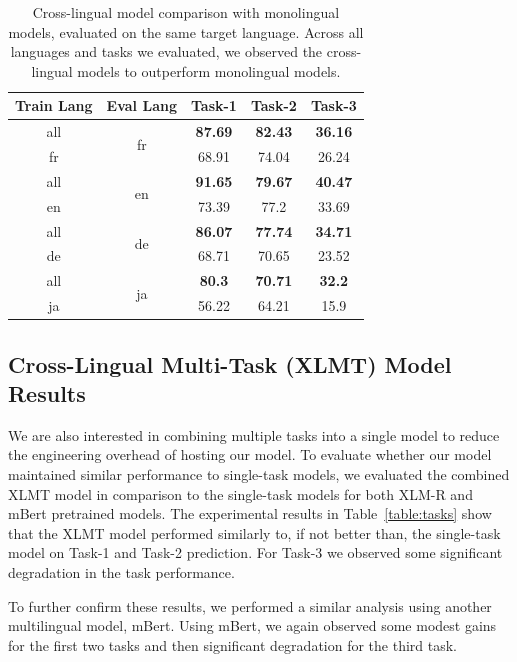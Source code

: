 \begin{table}[h]
\centering
\begin{tabular}{ccccc}
    \hline
    \textbf{Train Lang} & \textbf{Eval Lang} &  \textbf{Task-1} & \textbf{Task-2} & \textbf{Task-3} \\
    \hline
    all & \multirow{2}{*}{fr} & \textbf{87.69} & \textbf{82.43} & \textbf{36.16} \\
    fr & & 68.91 & 74.04 & 26.24 \\
    \hline
    all & \multirow{2}{*}{en} & \textbf{91.65} & \textbf{79.67} & \textbf{40.47} \\
    en & & 73.39 & 77.2 & 33.69 \\
    \hline
    all & \multirow{2}{*}{de} & \textbf{86.07} & \textbf{77.74} & \textbf{34.71} \\
    de & & 68.71 & 70.65 & 23.52 \\
    \hline
    all & \multirow{2}{*}{ja} & \textbf{80.3} & \textbf{70.71} & \textbf{32.2} \\
    ja & &  56.22 & 64.21 & 15.9 \\
    \hline
\end{tabular}
\caption{Cross-lingual model comparison with monolingual models, evaluated on the same target language.  Across all languages and tasks we evaluated, we observed the cross-lingual models to outperform monolingual models.}
\label{table:xlm}
\end{table}


\subsection{Cross-Lingual Multi-Task (XLMT) Model Results}
We are also interested in combining multiple tasks into a single model to reduce the engineering overhead of hosting our model.
To evaluate whether our model maintained similar performance to single-task models, we evaluated the combined XLMT model in comparison to the single-task models for both XLM-R and mBert pretrained models.
The experimental results in Table~\ref{table:tasks} show that the XLMT model performed similarly to, if not better than, the single-task model on Task-1 and Task-2 prediction.
For Task-3 we observed some significant degradation in the task performance.

To further confirm these results, we performed a similar analysis using another multilingual model, mBert.
Using mBert, we again observed some modest gains for the first two tasks and then significant degradation for the third task.

